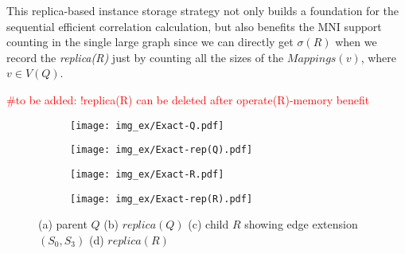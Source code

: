This replica-based instance storage strategy not only builds a foundation for the sequential
efficient correlation calculation, but also benefits the MNI support counting in
the single large graph since we can directly get $\sigma(R)$ when we record the
\textit{replica(R)} just by counting all the sizes of the $Mappings(v)$, where $v\in
V(Q)$.

\textcolor{red}{\#to be added: !replica(R) can be deleted after operate(R)-memory benefit}

\begin{figure}
	\begin{subfigure}[b]{0.15\textwidth}
            \texttt{[image: img\_ex/Exact-Q.pdf]}
            \caption{}
			\label{fig:exactq}
    \end{subfigure}%
    \hspace*{\fill}
	\begin{subfigure}[b]{0.35\textwidth}
            \texttt{[image: img\_ex/Exact-rep(Q).pdf]}
            \vspace{-1.3\baselineskip}
            \caption{}
			\label{fig:exactrepq}
	\end{subfigure}

	\captionsetup[subfigure]{skip=-2pt}
	\begin{subfigure}[b]{0.15\textwidth}
		\texttt{[image: img\_ex/Exact-R.pdf]}
		\caption{}
		\label{fig:exactr}
	\end{subfigure}%
	\hspace*{\fill}
	\begin{subfigure}[b]{0.35\textwidth}
		\texttt{[image: img\_ex/Exact-rep(R).pdf]}
		\caption{}
		\label{fig:exactrepr}
	\end{subfigure}
    \vspace{-1.75\baselineskip}
	\caption{\textup{(a)} parent $Q$ \textup{(b)} $replica(Q)$ \textup{(c)} child $R$ showing edge extension $(S_0, S_3)$ \textup{(d)} $replica(R)$}\label{fig:exactex}
	\vspace{-0.75\baselineskip}
\end{figure}

